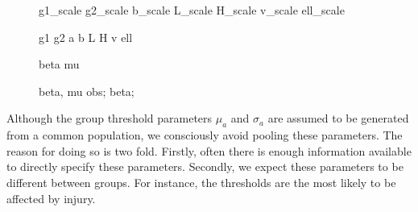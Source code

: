 \documentclass[a4paper,12pt]{article}
\begin{document}
\begin{figure}[H]
{        %
         {g1_scale}
         {g2_scale}
         {b_scale}
         {L_scale}
         {H_scale}
         {v_scale}
         {ell_scale}

         {g1}
         {g2}
         {a}
         {b}
         {L}
         {H}
         {v}
         {ell}

         {beta}
         {mu}

         {beta, mu}
         {obs};
         {beta};
    }
\end{figure}

Although the group threshold parameters $\mu_a$ and $\sigma_a$ are assumed to be generated from a common population, we consciously avoid pooling these parameters. The reason for doing so is two fold. Firstly, often there is enough information available to directly specify these parameters. Secondly, we expect these parameters to be different between groups. For instance, the thresholds are the most likely to be affected by injury.
\end{document}
